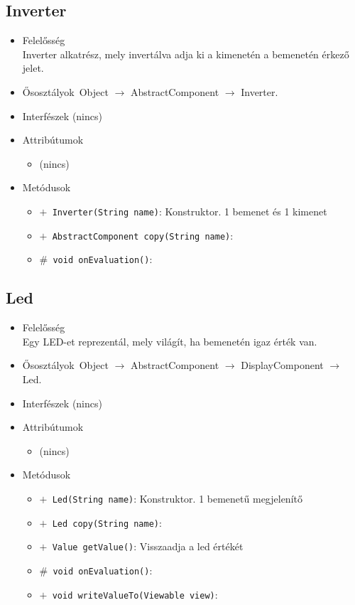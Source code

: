 \subsection{Inverter}
\begin{itemize}
\item Felelősség\\
Inverter alkatrész, mely invertálva adja ki a kimenetén a bemenetén  érkező jelet.
\item Ősosztályok\ Object $\rightarrow{}$ AbstractComponent $\rightarrow{}$ Inverter.
\item Interfészek (nincs)
\item Attribútumok $\ $
\begin{itemize}
\item (nincs)
\end{itemize}
\item Metódusok$\ $
\begin{itemize}
	\item[] \texttt{$+$ Inverter(String name)}: Konstruktor. 1 bemenet és 1 kimenet
	\item[] \texttt{$+$ AbstractComponent copy(String name)}: 
	\item[] \texttt{$\#$ void onEvaluation()}: 
\end{itemize}
\end{itemize}

\subsection{Led}
\begin{itemize}
\item Felelősség\\
Egy LED-et reprezentál, mely világít, ha bemenetén igaz érték van.
\item Ősosztályok\ Object $\rightarrow{}$ AbstractComponent $\rightarrow{}$ DisplayComponent $\rightarrow{}$ Led.
\item Interfészek (nincs)
\item Attribútumok $\ $
\begin{itemize}
\item (nincs)
\end{itemize}
\item Metódusok$\ $
\begin{itemize}
	\item[] \texttt{$+$ Led(String name)}: Konstruktor. 1 bemenetű megjelenítő
	\item[] \texttt{$+$ Led copy(String name)}: 
	\item[] \texttt{$+$ Value getValue()}: Visszaadja a led értékét
	\item[] \texttt{$\#$ void onEvaluation()}: 
	\item[] \texttt{$+$ void writeValueTo(Viewable view)}: 
\end{itemize}
\end{itemize}

